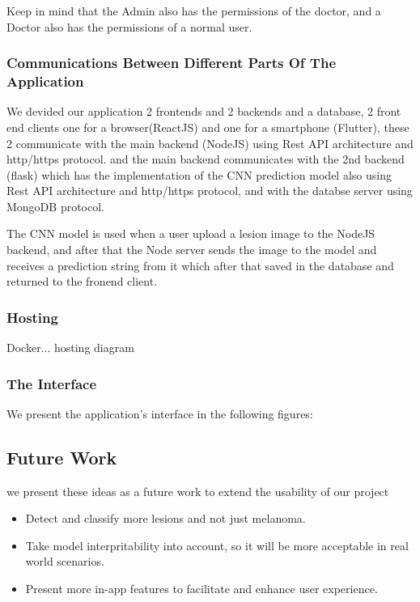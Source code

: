         Keep in mind that the Admin also has the permissions of the doctor, and a Doctor also has the permissions of a normal user.

    \subsubsection{Communications Between Different Parts Of The Application}
        We devided our application 2 frontends and 2 backends and a database, 2 front end clients one for a browser(ReactJS) and one for a smartphone (Flutter), these 2 communicate with the main backend (NodeJS) using Rest API architecture and http/https protocol. and the main backend communicates with the 2nd backend (flask) which has the implementation of the CNN prediction model also using Rest API architecture and http/https protocol, and with the databse server using MongoDB protocol.

        The CNN model is used when a user upload a lesion image to the NodeJS backend, and after that the Node server sends the image to the model and receives a prediction string from it which after that saved in the database and returned to the fronend client.

    \subsubsection{Hosting}
    Docker...
    hosting diagram

    \subsubsection{The Interface}
        We present the application's interface in the following figures: 


\subsection{Future Work}
    we present these ideas as a future work to extend the usability of our project
    \begin{itemize}
        \item Detect and classify more lesions and not just melanoma.
        \item Take model interpritability into account, so it will be more acceptable in real world scenarios.
        \item Present more in-app features to facilitate and enhance user experience. 
    \end{itemize}